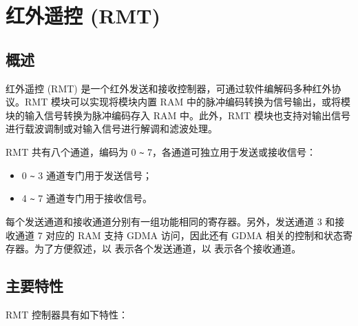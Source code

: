 \documentclass[main\_\_CN.tex]{subfiles}
\begin{document}

\ifglobal
\else
    {\let\clearpage\relax \listoftodos}
    {\let\clearpage\relax \listofdonetodos}
    \tableofcontents
\fi



\hypertarget{rmt}{}
\chapter{红外遥控 (RMT)}
\label{mod:rmt}

\section{概述}

红外遥控 (RMT) 是一个红外发送和接收控制器，可通过软件编解码多种红外协议。RMT 模块可以实现将模块内置 RAM 中的脉冲编码转换为信号输出，或将模块的输入信号转换为脉冲编码存入 RAM 中。此外，RMT 模块也支持对输出信号进行载波调制或对输入信号进行解调和滤波处理。

RMT 共有八个通道，编码为 0 \verb+~+ 7，各通道可独立用于发送或接收信号：
\begin{itemize}
    \item 0 \verb+~+ 3 通道专门用于发送信号；
    \item 4 \verb+~+ 7 通道专门用于接收信号。
\end{itemize}

每个发送通道和接收通道分别有一组功能相同的寄存器。另外，发送通道 3 和接收通道 7 对应的 RAM 支持 GDMA 访问，因此还有 GDMA 相关的控制和状态寄存器。为了方便叙述，以  表示各个发送通道，以  表示各个接收通道。

\section{主要特性}

RMT 控制器具有如下特性：
\end{document}
